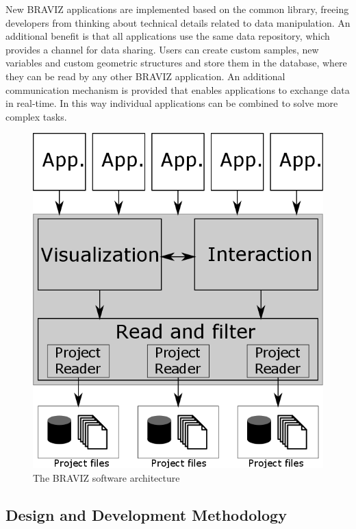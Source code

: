 \documentclass[twocolumn]{svjour3}
\begin{document}
New BRAVIZ applications are implemented based on the common library, freeing developers from thinking about technical details related to data manipulation. An additional benefit is that all applications use the same data repository, which provides a channel for data sharing. Users can create custom samples, new variables and custom geometric structures and store them in the database, where they can be read by any other BRAVIZ application. An additional communication mechanism is provided that enables applications to exchange data in real-time. In this way individual applications can be combined to solve more complex tasks.

\begin{figure}
\begin{center}
\includegraphics[width=0.6\linewidth]{figures/arquitecture.png}
\end{center}
 \caption{\label{fig_arch} The BRAVIZ software architecture}
\end{figure}


\subsection{Design and Development Methodology}
\end{document}
